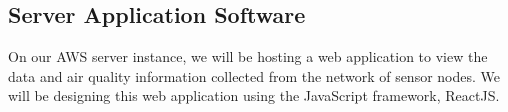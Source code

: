 \subsection{Server Application Software}
On our AWS server instance, we will be hosting a web application to view the data and air quality information collected from the network of sensor nodes. We will be designing this web application using the JavaScript framework, ReactJS.